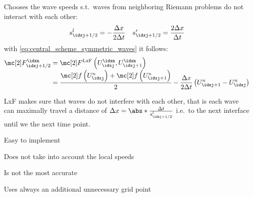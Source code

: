 \begin{defnbox}\nospacing
    \begin{defn}\label{defn:lax_friedrichs_scheme}
        Chooses the wave speeds s.t.\ waves from neighboring Riemann problems do not interact with each other:
        \begin{align}
          s_{\idxj+1/2}^{l}=-\frac{\Delta x}{2\Delta t}&&s_{\idxj+1/2}^{r}=\frac{2\Delta x}{\Delta t}
        \end{align}
        with \cref{eq:central_scheme_symmetric_waves} it follows:
        \begin{align}
          \Flux_{\idxj+1/2}^{\idxn}&=\Flux^{\text{LxF}}\left(U^{\idxn}_{\idxj},U^{\idxn}_{\idxj+1}\right)\\[-1\jot]
          &=\frac{\flux\left(U_{\idxj}^{n}\right)+\flux \left(U_{\idxj+1}^{n}\right)}{2}-\frac{\Delta x}{2\Delta t}\left(U_{\idxj+1}^{n}-U_{\idxj}^{n}\right)\nonumber
        \end{align}
    \end{defn}
\end{defnbox}
\begin{explanationbox}\nospacing
    \begin{explanation}
        LxF makes sure that waves do not interfere with each other, that is each wave can maximally travel a distance of $\Delta x=\abs*{\frac{\Delta t}{s_{\idxj+1/2}^{l}}}$ i.e.\ to the next interface until we the next time point.
    \end{explanation}
\end{explanationbox}
\begin{sectionbox}\nospacing
    \begin{minipage}[t]{0.4\textwidth}
       \begin{proslist}
           \item Easy to implement
       \end{proslist}
    \end{minipage}
    \begin{minipage}[t]{0.55\textwidth}
       \begin{conslist}
           \item Does not take into account the local speeds
           \item Is not the most accurate
           \item Uses always an additional unnecessary grid point
       \end{conslist}
    \end{minipage}
\end{sectionbox}

